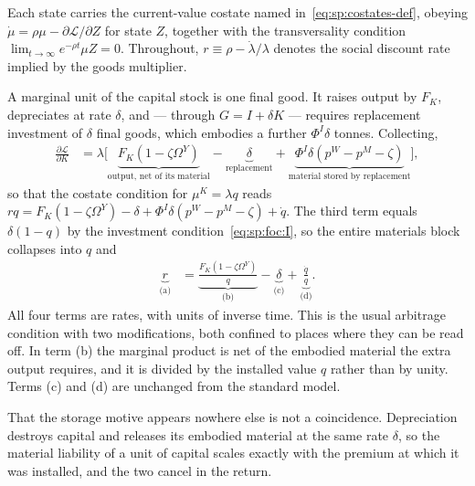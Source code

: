 Each state carries the current-value costate named in~\eqref{eq:sp:costates-def}, obeying $\dot\mu=\rho\mu-\partial\mathcal L/\partial Z$ for state $Z$, together with the transversality condition $\lim_{t\to\infty}e^{-\rho t}\mu Z=0$. Throughout, $r\equiv\rho-\dot\lambda/\lambda$ denotes the social discount rate implied by the goods multiplier.

 A marginal unit of the capital stock is one final good. It raises output by $F_K$, depreciates at rate $\delta$, and --- through $G=I+\delta K$ --- requires replacement investment of $\delta$ final goods, which embodies a further $\Phi^I\delta$ tonnes. Collecting,
\begin{align*}
\frac{\partial\mathcal L}{\partial K} &= \lambda\Big[\underbrace{F_K\left(1-\zeta\Omega^Y\right)}_{\text{output, net of its material}}-\underbrace{\delta}_{\text{replacement}}+\underbrace{\Phi^I\delta\left(p^W-p^M-\zeta\right)}_{\text{material stored by replacement}}\Big],
\end{align*}
so that the costate condition for $\mu^K=\lambda q$ reads $rq=F_K\left(1-\zeta\Omega^Y\right)-\delta+\Phi^I\delta\left(p^W-p^M-\zeta\right)+\dot q$. The third term equals $\delta\left(1-q\right)$ by the investment condition~\eqref{eq:sp:foc:I}, so the entire materials block collapses into $q$ and
\begin{align}
\underbrace{r}_{\text{(a)}} &= \underbrace{\frac{F_K\left(1-\zeta\Omega^Y\right)}{q}}_{\text{(b)}}-\underbrace{\delta}_{\text{(c)}}+\underbrace{\frac{\dot q}{q}}_{\text{(d)}} .
\label{eq:sp:costate:K}
\end{align}
All four terms are rates, with units of inverse time. This is the usual arbitrage condition with two modifications, both confined to places where they can be read off. In term (b) the marginal product is net of the embodied material the extra output requires, and it is divided by the installed value $q$ rather than by unity. Terms (c) and (d) are unchanged from the standard model.

That the storage motive appears nowhere else is not a coincidence. Depreciation destroys capital and releases its embodied material at the same rate $\delta$, so the material liability of a unit of capital scales exactly with the premium at which it was installed, and the two cancel in the return.

